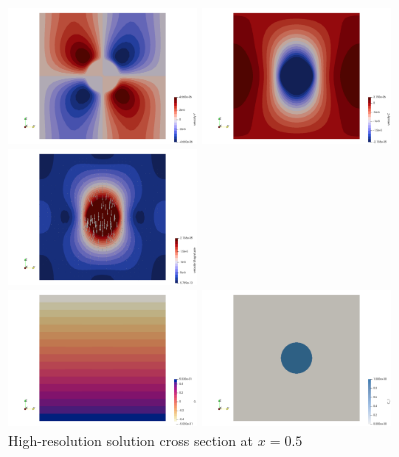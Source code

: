 \begin{center}
\includegraphics[width=5cm]{images/stokes_sphere3D/aspect_amr_FS/vely}
\includegraphics[width=5cm]{images/stokes_sphere3D/aspect_amr_FS/velz}
\includegraphics[width=5cm]{images/stokes_sphere3D/aspect_amr_FS/vel}\\
\includegraphics[width=5cm]{images/stokes_sphere3D/aspect_amr_FS/press}
\includegraphics[width=5cm]{images/stokes_sphere3D/aspect_amr_FS/C1}\\
{\captionfont High-resolution solution cross section at $x=0.5$}
\end{center}

\newpage
